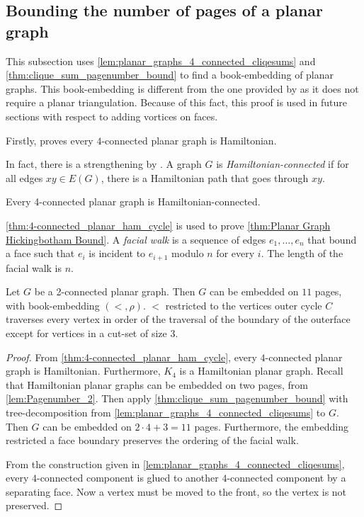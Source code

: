 \subsection{Bounding the number of pages of a planar graph}
This subsection uses \cref{lem:planar_graphs_4_connected_cliqesums} and \cref{thm:clique_sum_pagenumber_bound} to find a book-embedding of planar graphs. This book-embedding is different from the one provided by \textcite{yannakakisEmbeddingPlanarGraphs1989} as it does not require a planar triangulation. Because of this fact, this proof is used in future sections with respect to adding vortices on faces. 

Firstly, \textcite{tutteTheoremPlanarGraphs1956} proves every $4$-connected planar graph is Hamiltonian.

In fact, there is a strengthening by \textcite{thomassenTheoremPathsPlanar1983}. A graph $G$ is \textit{Hamiltonian-connected} if for all edges $xy \in E(G)$, there is a Hamiltonian path that goes through $xy$. 

\begin{theorem}\label{thm:4-connected_planar_ham_cycle}
	Every 4-connected planar graph is Hamiltonian-connected.
\end{theorem}


\cref{thm:4-connected_planar_ham_cycle} is used to prove \cref{thm:Planar Graph Hickingbotham Bound}. A \textit{facial walk} is a sequence of edges \(e_1, \ldots, e_n\) that bound a face such that \(e_i\) is incident to \(e_{i + 1}\) modulo \(n\) for every \(i\). The length of the facial walk is \(n\).


\begin{corollary}\label{thm:Planar Graph Hickingbotham Bound}
	Let \(G\) be a 2-connected planar graph. Then $G$ can be embedded on $11$ pages, with book-embedding $(<, \rho)$. $<$ restricted to the vertices outer cycle $C$ traverses every vertex in order of the traversal of the boundary of the outerface except for vertices in a cut-set of size 3.
\end{corollary}
\begin{proof}
	From \cref{thm:4-connected_planar_ham_cycle}, every $4$-connected planar graph is Hamiltonian. Furthermore, $K_4$ is a Hamiltonian planar graph.
	Recall that Hamiltonian planar graphs can be embedded on two pages, from \cref{lem:Pagenumber_2}. 
	Then apply \cref{thm:clique_sum_pagenumber_bound} with tree-decomposition from \cref{lem:planar_graphs_4_connected_cliqesums} to $G$. Then $G$ can be embedded on \(2 \cdot 4 + 3 = 11\) pages. Furthermore, the embedding restricted a face boundary preserves the ordering of the facial walk.

	From the construction given in \cref{lem:planar_graphs_4_connected_cliqesums}, every $4$-connected component is glued to another $4$-connected component by a separating face. Now a vertex must be moved to the front, so the vertex is not preserved. 
\end{proof}

